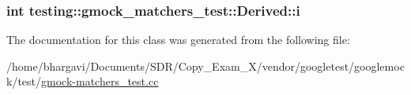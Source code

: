 \subsubsection[{\texorpdfstring{i}{i}}]{\setlength{\rightskip}{0pt plus 5cm}int testing\+::gmock\+\_\+matchers\+\_\+test\+::\+Derived\+::i}\hypertarget{classtesting_1_1gmock__matchers__test_1_1_derived_a357d6747c44d7af7159fb5898a782f1b}{}\label{classtesting_1_1gmock__matchers__test_1_1_derived_a357d6747c44d7af7159fb5898a782f1b}


The documentation for this class was generated from the following file\+:\begin{DoxyCompactItemize}
\item 
/home/bhargavi/\+Documents/\+S\+D\+R/\+Copy\+\_\+\+Exam\+\_\+X/vendor/googletest/googlemock/test/\hyperlink{gmock-matchers__test_8cc}{gmock-\/matchers\+\_\+test.\+cc}\end{DoxyCompactItemize}

